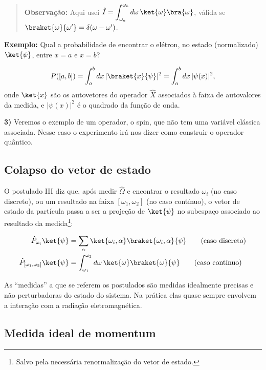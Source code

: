 \begin{quote}
\textbf{Observação:} Aqui usei $\hat{I} = \displaystyle\int_{\omega_a}^{\omega_b} d\omega\, \ket{\omega}\bra{\omega}$, válida se $\braket{\omega}{\omega'} = \delta(\omega-\omega')$.
\end{quote}

\textbf{Exemplo:} Qual a probabilidade de encontrar o elétron, no estado (normalizado) $\ket{\psi}$, entre $x=a$ e $x=b$?

\begin{equation}
P([a,b]) = \int_a^b dx\, |\braket{x}{\psi}|^2 = \int_a^b dx\, |\psi(x)|^2,
\end{equation}
onde $\ket{x}$ são os autovetores do operador $\hat{X}$ associados à faixa de autovalores da medida, e $|\psi(x)|^2$ é o quadrado da função de onda.

\textbf{3)} Veremos o exemplo de um operador, o spin, que não tem uma variável clássica associada. Nesse caso o experimento irá nos dizer como construir o operador quântico.

\subsection*{Colapso do vetor de estado}

O postulado III diz que, após medir $\hat{\Omega}$ e encontrar o resultado $\omega_i$ (no caso discreto), ou um resultado na faixa $[\omega_1,\omega_2]$ (no caso contínuo), o vetor de estado da partícula passa a ser a projeção de $\ket{\psi}$ no subespaço associado ao resultado da medida\footnote{Salvo pela necessária renormalização do vetor de estado.}:

\begin{align}
\hat{P}_{\omega_i}\ket{\psi} &= \sum_\alpha \ket{\omega_i,\alpha}\braket{\omega_i,\alpha}{\psi} \qquad \text{(caso discreto)}\\
\hat{P}_{[\omega_1,\omega_2]}\ket{\psi} &= \int_{\omega_1}^{\omega_2} d\omega\, \ket{\omega}\braket{\omega}{\psi} \qquad \text{(caso contínuo)}
\end{align}

As ``medidas'' a que se referem os postulados são medidas idealmente precisas e não perturbadoras do estado do sistema. Na prática elas quase sempre envolvem a interação com a radiação eletromagnética.

\subsection*{Medida ideal de momentum}

